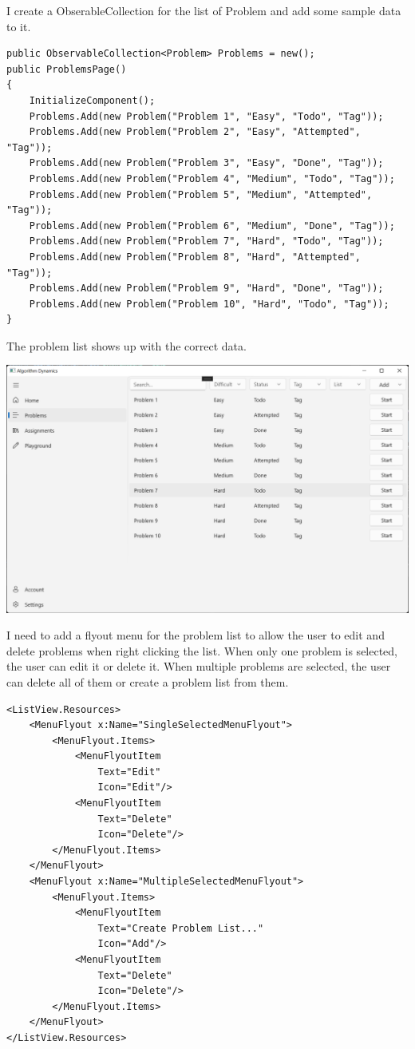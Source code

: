 \documentclass[a4paper]{report}
\begin{document}
I create a ObserableCollection for the list of Problem and add some sample data to it.

\begin{verbatim}
public ObservableCollection<Problem> Problems = new();
public ProblemsPage()
{
    InitializeComponent();
    Problems.Add(new Problem("Problem 1", "Easy", "Todo", "Tag"));
    Problems.Add(new Problem("Problem 2", "Easy", "Attempted", "Tag"));
    Problems.Add(new Problem("Problem 3", "Easy", "Done", "Tag"));
    Problems.Add(new Problem("Problem 4", "Medium", "Todo", "Tag"));
    Problems.Add(new Problem("Problem 5", "Medium", "Attempted", "Tag"));
    Problems.Add(new Problem("Problem 6", "Medium", "Done", "Tag"));
    Problems.Add(new Problem("Problem 7", "Hard", "Todo", "Tag"));
    Problems.Add(new Problem("Problem 8", "Hard", "Attempted", "Tag"));
    Problems.Add(new Problem("Problem 9", "Hard", "Done", "Tag"));
    Problems.Add(new Problem("Problem 10", "Hard", "Todo", "Tag"));
}
\end{verbatim}

The problem list shows up with the correct data.

\includegraphics[width=\textwidth, height=\textheight, keepaspectratio]{ProblemsPage-ProblemList}

I need to add a flyout menu for the problem list to allow the user to edit and delete problems when right clicking the list. When only one problem is selected, the user can edit it or delete it. When multiple problems are selected, the user can delete all of them or create a problem list from them.

\begin{verbatim}
<ListView.Resources>
    <MenuFlyout x:Name="SingleSelectedMenuFlyout">
        <MenuFlyout.Items>
            <MenuFlyoutItem 
                Text="Edit"
                Icon="Edit"/>
            <MenuFlyoutItem 
                Text="Delete"
                Icon="Delete"/>
        </MenuFlyout.Items>
    </MenuFlyout>
    <MenuFlyout x:Name="MultipleSelectedMenuFlyout">
        <MenuFlyout.Items>
            <MenuFlyoutItem 
                Text="Create Problem List..."
                Icon="Add"/>
            <MenuFlyoutItem 
                Text="Delete"
                Icon="Delete"/>
        </MenuFlyout.Items>
    </MenuFlyout>
</ListView.Resources>
\end{verbatim}
\end{document}
